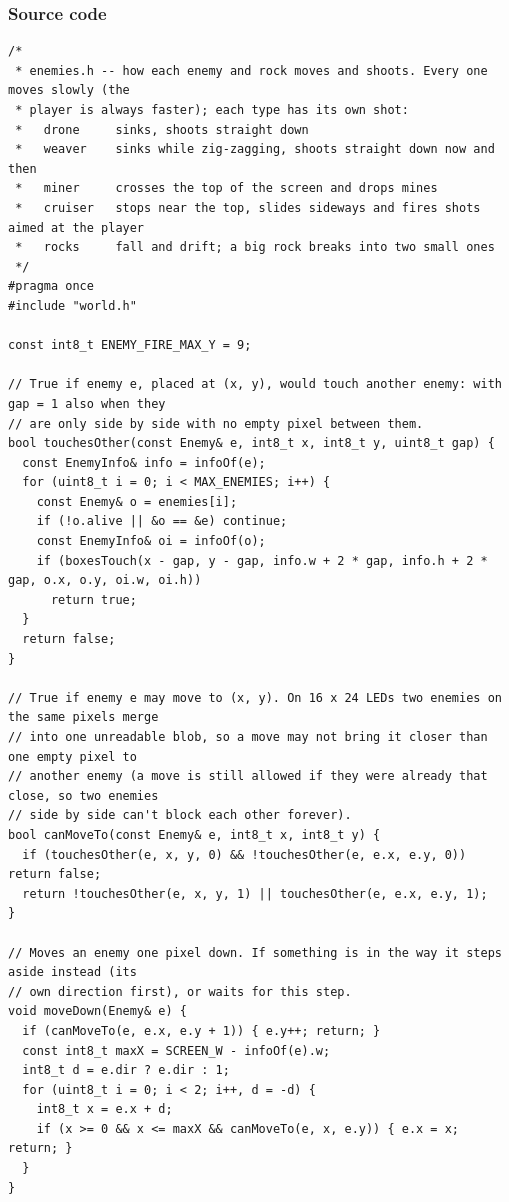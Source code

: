 \documentclass[11pt,a4paper]{article}
\begin{document}
\subsubsection*{Source code}
\begin{lstlisting}[language=Arduino]
/*
 * enemies.h -- how each enemy and rock moves and shoots. Every one moves slowly (the
 * player is always faster); each type has its own shot:
 *   drone     sinks, shoots straight down
 *   weaver    sinks while zig-zagging, shoots straight down now and then
 *   miner     crosses the top of the screen and drops mines
 *   cruiser   stops near the top, slides sideways and fires shots aimed at the player
 *   rocks     fall and drift; a big rock breaks into two small ones
 */
#pragma once
#include "world.h"

const int8_t ENEMY_FIRE_MAX_Y = 9;

// True if enemy e, placed at (x, y), would touch another enemy: with gap = 1 also when they
// are only side by side with no empty pixel between them.
bool touchesOther(const Enemy& e, int8_t x, int8_t y, uint8_t gap) {
  const EnemyInfo& info = infoOf(e);
  for (uint8_t i = 0; i < MAX_ENEMIES; i++) {
    const Enemy& o = enemies[i];
    if (!o.alive || &o == &e) continue;
    const EnemyInfo& oi = infoOf(o);
    if (boxesTouch(x - gap, y - gap, info.w + 2 * gap, info.h + 2 * gap, o.x, o.y, oi.w, oi.h))
      return true;
  }
  return false;
}

// True if enemy e may move to (x, y). On 16 x 24 LEDs two enemies on the same pixels merge
// into one unreadable blob, so a move may not bring it closer than one empty pixel to
// another enemy (a move is still allowed if they were already that close, so two enemies
// side by side can't block each other forever).
bool canMoveTo(const Enemy& e, int8_t x, int8_t y) {
  if (touchesOther(e, x, y, 0) && !touchesOther(e, e.x, e.y, 0)) return false;
  return !touchesOther(e, x, y, 1) || touchesOther(e, e.x, e.y, 1);
}

// Moves an enemy one pixel down. If something is in the way it steps aside instead (its
// own direction first), or waits for this step.
void moveDown(Enemy& e) {
  if (canMoveTo(e, e.x, e.y + 1)) { e.y++; return; }
  const int8_t maxX = SCREEN_W - infoOf(e).w;
  int8_t d = e.dir ? e.dir : 1;
  for (uint8_t i = 0; i < 2; i++, d = -d) {
    int8_t x = e.x + d;
    if (x >= 0 && x <= maxX && canMoveTo(e, x, e.y)) { e.x = x; return; }
  }
}


\end{lstlisting}
\end{document}
